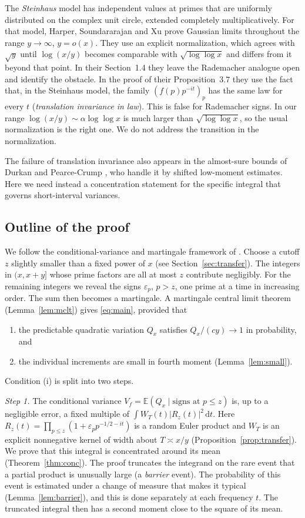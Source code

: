 \documentclass[11pt]{amsart}
\theoremstyle{remark}
\numberwithin{equation}{section}
\newcommand{\E}{\mathbb{E}}
\newcommand{\dd}{\,\mathrm{d}}
\begin{document}
The \emph{Steinhaus} model has independent values at primes that are uniformly distributed on the complex unit circle, extended completely multiplicatively. For that model, Harper, Soundararajan and Xu \cite[Theorem~1.1]{HSX} prove Gaussian limits throughout the range $y\to\infty$, $y=o(x)$. They use an explicit normalization, which agrees with $\sqrt{y}$ until $\log(x/y)$ becomes comparable with $\sqrt{\log\log x}$ and differs from it beyond that point. In their Section~1.4 they leave the Rademacher analogue open and identify the obstacle. In the proof of their Proposition~3.7 they use the fact that, in the Steinhaus model, the family $(f(p)p^{-it})_p$ has the same law for every $t$ (\emph{translation invariance in law}). This is false for Rademacher signs. In our range $\log(x/y)\sim\alpha\log\log x$ is much larger than $\sqrt{\log\log x}$, so the usual normalization is the right one. We do not address the transition in the normalization.

The failure of translation invariance also appears in the almost-sure bounds of Durkan and Pearce-Crump \cite[Section~8.2]{DPC}, who handle it by shifted low-moment estimates. Here we need instead a concentration statement for the specific integral that governs short-interval variances.

\subsection{Outline of the proof}
We follow the conditional-variance and martingale framework of \cite[Sections~2--4]{HSX}. Choose a cutoff $z$ slightly smaller than a fixed power of $x$ (see Section~\ref{sec:transfer}). The integers in $(x,x+y]$ whose prime factors are all at most $z$ contribute negligibly. For the remaining integers we reveal the signs $\varepsilon_p$, $p>z$, one prime at a time in increasing order. The sum then becomes a martingale. A martingale central limit theorem (Lemma~\ref{lem:mclt}) gives \eqref{eq:main}, provided that
\begin{enumerate}[label=(\roman*)]
\item the predictable quadratic variation $Q_x$ satisfies $Q_x/(cy)\to1$ in probability, and
\item the individual increments are small in fourth moment (Lemma~\ref{lem:small}).
\end{enumerate}
Condition (i) is split into two steps.

\emph{Step 1.} The conditional variance $V_f=\E(Q_x\mid\text{signs at }p\le z)$ is, up to a negligible error, a fixed multiple of $\int W_T(t)|R_z(t)|^2\dd t$. Here $R_z(t)=\prod_{p\le z}(1+\varepsilon_pp^{-1/2-it})$ is a random Euler product and $W_T$ is an explicit nonnegative kernel of width about $T\asymp x/y$ (Proposition~\ref{prop:transfer}). We prove that this integral is concentrated around its mean (Theorem~\ref{thm:conc}). The proof truncates the integrand on the rare event that a partial product is unusually large (a \emph{barrier} event). The probability of this event is estimated under a change of measure that makes it typical (Lemma~\ref{lem:barrier}), and this is done separately at each frequency $t$. The truncated integral then has a second moment close to the square of its mean.
\end{document}
